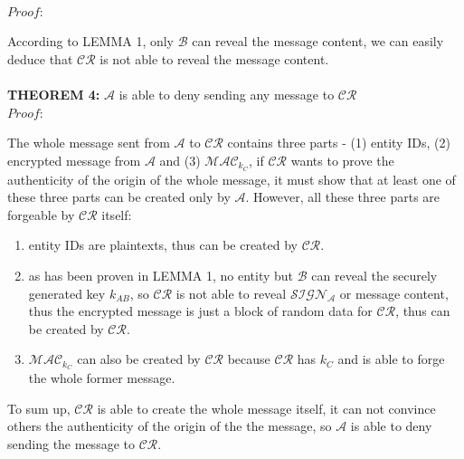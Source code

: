 \\
\emph{$Proof:$} \par
According to LEMMA 1, only $\mathcal{B}$ can reveal the message content, we can easily deduce that $\mathcal{CR}$ is not able to reveal the message content.
\\
\\
\textbf{THEOREM 4:} $\mathcal{A}$ is able to deny sending any message to $\mathcal{CR}$
\\
\emph{$Proof:$} \par
The whole message sent from $\mathcal{A}$ to $\mathcal{CR}$ contains three parts - (1) entity IDs, (2) encrypted message from $\mathcal{A}$ and (3) $\mathcal{MAC}_{k_C}$, if $\mathcal{CR}$ wants to prove the authenticity of the origin of the whole message, it must show that at least one of these three parts can be created only by $\mathcal{A}$. However, all these three parts are forgeable by $\mathcal{CR}$ itself:
\begin{enumerate}
\item entity IDs are plaintexts, thus can be created by $\mathcal{CR}$.
\item as has been proven in LEMMA 1, no entity but $\mathcal{B}$ can reveal the securely generated key $k_{AB}$, so $\mathcal{CR}$ is not able to reveal $\mathcal{SIGN_A}$ or message content, thus the encrypted message is just a block of random data for $\mathcal{CR}$, thus can be created by $\mathcal{CR}$.
\item $\mathcal{MAC}_{k_C}$ can also be created by $\mathcal{CR}$ because $\mathcal{CR}$ has $k_C$ and is able to forge the whole former message.
\end{enumerate}
To sum up, $\mathcal{CR}$ is able to create the whole message itself, it can not convince others the authenticity of the origin of the the message, so $\mathcal{A}$ is able to deny sending the message to $\mathcal{CR}$.

